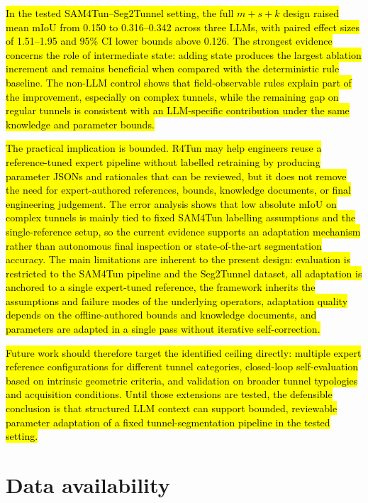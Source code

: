 \documentclass[a4paper,fleqn]{cas-dc}
\begin{document}
\hl{In the tested SAM4Tun--Seg2Tunnel setting, the full \mbox{$m+s+k$} design raised mean mIoU from 0.150 to 0.316--0.342 across three LLMs, with paired effect sizes of 1.51--1.95 and 95\% CI lower bounds above 0.126. The strongest evidence concerns the role of intermediate state: adding state produces the largest ablation increment and remains beneficial when compared with the deterministic rule baseline. The non-LLM control shows that field-observable rules explain part of the improvement, especially on complex tunnels, while the remaining gap on regular tunnels is consistent with an LLM-specific contribution under the same knowledge and parameter bounds.}

\hl{The practical implication is bounded. R4Tun may help engineers reuse a reference-tuned expert pipeline without labelled retraining by producing parameter JSONs and rationales that can be reviewed, but it does not remove the need for expert-authored references, bounds, knowledge documents, or final engineering judgement. The error analysis shows that low absolute mIoU on complex tunnels is mainly tied to fixed SAM4Tun labelling assumptions and the single-reference setup, so the current evidence supports an adaptation mechanism rather than autonomous final inspection or state-of-the-art segmentation accuracy. The main limitations are inherent to the present design: evaluation is restricted to the SAM4Tun pipeline and the Seg2Tunnel dataset, all adaptation is anchored to a single expert-tuned reference, the framework inherits the assumptions and failure modes of the underlying operators, adaptation quality depends on the offline-authored bounds and knowledge documents, and parameters are adapted in a single pass without iterative self-correction.}

\hl{Future work should therefore target the identified ceiling directly: multiple expert reference configurations for different tunnel categories, closed-loop self-evaluation based on intrinsic geometric criteria, and validation on broader tunnel typologies and acquisition conditions. Until those extensions are tested, the defensible conclusion is that structured LLM context can support bounded, reviewable parameter adaptation of a fixed tunnel-segmentation pipeline in the tested setting.}


\section*{Data availability}
\end{document}
